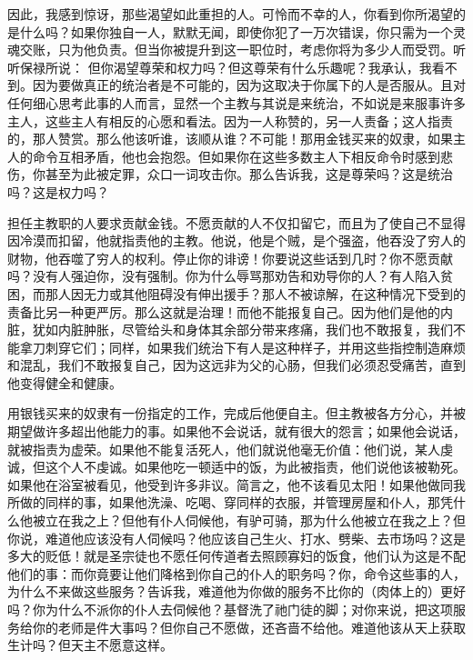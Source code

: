 因此，我感到惊讶，那些渴望如此重担的人。可怜而不幸的人，你看到你所渴望的是什么吗？如果你独自一人，默默无闻，即使你犯了一万次错误，你只需为一个灵魂交账，只为他负责。但当你被提升到这一职位时，考虑你将为多少人而受罚。听听保禄所说： 但你渴望尊荣和权力吗？但这尊荣有什么乐趣呢？我承认，我看不到。因为要做真正的统治者是不可能的，因为这取决于你属下的人是否服从。且对任何细心思考此事的人而言，显然一个主教与其说是来统治，不如说是来服事许多主人，这些主人有相反的心愿和看法。因为一人称赞的，另一人责备；这人指责的，那人赞赏。那么他该听谁，该顺从谁？不可能！那用金钱买来的奴隶，如果主人的命令互相矛盾，他也会抱怨。但如果你在这些多数主人下相反命令时感到悲伤，你甚至为此被定罪，众口一词攻击你。那么告诉我，这是尊荣吗？这是统治吗？这是权力吗？\par

担任主教职的人要求贡献金钱。不愿贡献的人不仅扣留它，而且为了使自己不显得因冷漠而扣留，他就指责他的主教。他说，他是个贼，是个强盗，他吞没了穷人的财物，他吞噬了穷人的权利。停止你的诽谤！你要说这些话到几时？你不愿贡献吗？没有人强迫你，没有强制。你为什么辱骂那劝告和劝导你的人？有人陷入贫困，而那人因无力或其他阻碍没有伸出援手？那人不被谅解，在这种情况下受到的责备比另一种更严厉。那么这就是治理！而他不能报复自己。因为他们是他的内脏，犹如内脏肿胀，尽管给头和身体其余部分带来疼痛，我们也不敢报复，我们不能拿刀刺穿它们；同样，如果我们统治下有人是这种样子，并用这些指控制造麻烦和混乱，我们不敢报复自己，因为这远非为父的心肠，但我们必须忍受痛苦，直到他变得健全和健康。\par

用银钱买来的奴隶有一份指定的工作，完成后他便自主。但主教被各方分心，并被期望做许多超出他能力的事。如果他不会说话，就有很大的怨言；如果他会说话，就被指责为虚荣。如果他不能复活死人，他们就说他毫无价值：他们说，某人虔诚，但这个人不虔诚。如果他吃一顿适中的饭，为此被指责，他们说他该被勒死。如果他在浴室被看见，他受到许多非议。简言之，他不该看见太阳！如果他做同我所做的同样的事，如果他洗澡、吃喝、穿同样的衣服，并管理房屋和仆人，那凭什么他被立在我之上？但他有仆人伺候他，有驴可骑，那为什么他被立在我之上？但你说，难道他应该没有人伺候吗？他应该自己生火、打水、劈柴、去市场吗？这是多大的贬低！就是圣宗徒也不愿任何传道者去照顾寡妇的饭食，他们认为这是不配他们的事：而你竟要让他们降格到你自己的仆人的职务吗？你，命令这些事的人，为什么不来做这些服务？告诉我，难道他为你做的服务不比你的（肉体上的）更好吗？你为什么不派你的仆人去伺候他？基督洗了祂门徒的脚；对你来说，把这项服务给你的老师是件大事吗？但你自己不愿做，还吝啬不给他。难道他该从天上获取生计吗？但天主不愿意这样。\par


